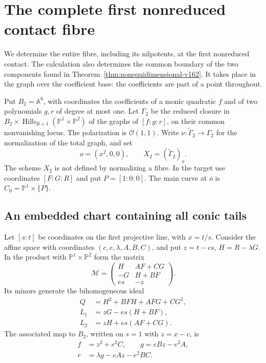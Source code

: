 \documentclass[11pt,reqno]{amsart}
\numberwithin{equation}{section}
\theoremstyle{definition}\newtheorem{definition}[theorem]{Definition}
\theoremstyle{remark}\newtheorem{remark}[theorem]{Remark}
\newcommand{\Pj}{\mathbb P}\newcommand{\A}{\mathbb A}
\newcommand{\OO}{\mathcal O}\newcommand{\II}{\mathcal I}
\begin{document}
\section{The complete first nonreduced contact fibre}
\label{sec:complete-contact-v163}
We determine the entire fibre, including its nilpotents, at the first
nonreduced contact. The calculation also determines the common boundary
of the two components found in Theorem~\ref{thm:nonequidimensional-v162}.
It takes place in the graph over the coefficient base: the coefficients
are part of a point throughout.

Put $B_2=\mathbb A^6$, with coordinates the coefficients of a monic
quadratic $f$ and of two polynomials $g,r$ of degree at most one. Let
$\Gamma_2$ be the reduced closure in
$B_2\times\operatorname{Hilb}_{3l+1}(\Pj^1\times\Pj^2)$ of the graphs
of $[f:g:r]$, on their common nonvanishing locus. The polarization is
$\OO(1,1)$. Write $\nu:\widetilde\Gamma_2\to\Gamma_2$ for the
normalization of the total graph, and set
\[
 o=(x^2,0,0),\qquad X_2=(\widetilde\Gamma_2)_o.
\]
The scheme $X_2$ is not defined by normalizing a fibre. In the target
use coordinates $[F:G:R]$ and put $P=[1:0:0]$. The main curve at $o$
is $C_0=\Pj^1\times\{P\}$.

\subsection{An embedded chart containing all conic tails}
Let $[s:t]$ be coordinates on the first projective line, with $x=t/s$.
Consider the affine space with coordinates $(c,e,\lambda,A,B,C)$, and put
$z=t-cs$, $H=R-\lambda G$. In the product with $\Pj^1\times\Pj^2$
form the matrix
\begin{equation}\label{eq:HB-matrix-v163}
 \mathcal M=
 \begin{pmatrix}
 H&AF+CG\\
 -G&H+BF\\
 es&-z
 \end{pmatrix}.
\end{equation}
Its minors generate the bihomogeneous ideal
\begin{equation}\label{eq:HB-ideal-v163}
 \begin{split}
 Q&=H^2+BFH+AFG+CG^2,\\
 L_1&=zG-es(H+BF),\\
 L_2&=zH+es(AF+CG).
 \end{split}
\end{equation}
The associated map to $B_2$, written on $s=1$ with $z=x-c$, is
\begin{equation}\label{eq:HB-base-v163}
 \begin{split}
 f&=z^2+e^2C,\qquad g=eBz-e^2A,\\
 r&=\lambda g-eAz-e^2BC.
 \end{split}
\end{equation}
\end{document}
